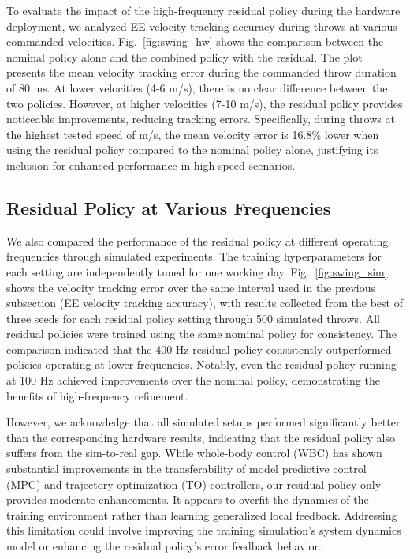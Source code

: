 \documentclass[letterpaper, 10 pt, conference]{ieeeconf} %
\begin{document}

% 

To evaluate the impact of the high-frequency residual policy during the hardware deployment, we analyzed EE velocity tracking accuracy during throws at various commanded velocities. Fig.~\ref{fig:swing_hw} shows the comparison between the nominal policy alone and the combined policy with the residual. The plot presents the mean velocity tracking error during the commanded throw duration of 80 ms. At lower velocities (4-6 m/s), there is no clear difference between the two policies. However, at higher velocities (7-10 m/s), the residual policy provides noticeable improvements, reducing tracking errors. Specifically, during throws at the highest tested speed of \unit[10]{m/s}, the mean velocity error is 16.8\% lower when using the residual policy compared to the nominal policy alone, justifying its inclusion for enhanced performance in high-speed scenarios.

\subsection{Residual Policy at Various Frequencies}

We also compared the performance of the residual policy at different operating frequencies through simulated experiments. The training hyperparameters for each setting are independently tuned for one working day. Fig.~\ref{fig:swing_sim} shows the velocity tracking error over the same interval used in the previous subsection (EE velocity tracking accuracy), with results collected from the best of three seeds for each residual policy setting through 500 simulated throws. All residual policies were trained using the same nominal policy for consistency. The comparison indicated that the 400 Hz residual policy consistently outperformed policies operating at lower frequencies. Notably, even the residual policy running at 100 Hz achieved improvements over the nominal policy, demonstrating the benefits of high-frequency refinement.

However, we acknowledge that all simulated setups performed significantly better than the corresponding hardware results, indicating that the residual policy also suffers from the sim-to-real gap. While whole-body control (WBC) has shown substantial improvements in the transferability of model predictive control (MPC) and trajectory optimization (TO) controllers, our residual policy only provides moderate enhancements. It appears to overfit the dynamics of the training environment rather than learning generalized local feedback. Addressing this limitation could involve improving the training simulation's system dynamics model or enhancing the residual policy's error feedback behavior.
\end{document}
